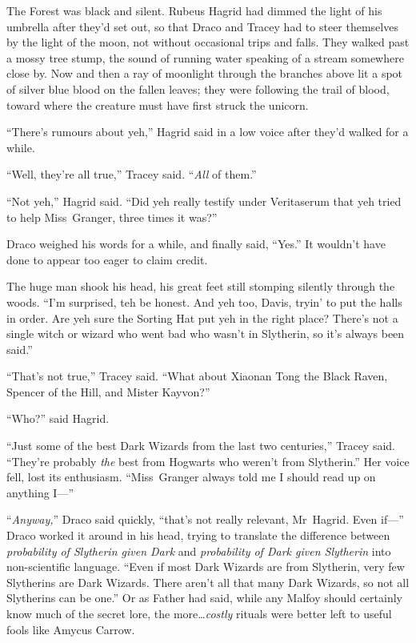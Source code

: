 The Forest was black and silent. Rubeus Hagrid had dimmed the light of his umbrella after they’d set out, so that Draco and Tracey had to steer themselves by the light of the moon, not without occasional trips and falls. They walked past a mossy tree stump, the sound of running water speaking of a stream somewhere close by. Now and then a ray of moonlight through the branches above lit a spot of silver blue blood on the fallen leaves; they were following the trail of blood, toward where the creature must have first struck the unicorn.

“There’s rumours about yeh,” Hagrid said in a low voice after they’d walked for a while.

“Well, they’re all true,” Tracey said. “\emph{All} of them.”

“Not yeh,” Hagrid said. “Did yeh really testify under Veritaserum that yeh tried to help Miss~Granger, three times it was?”

Draco weighed his words for a while, and finally said, “Yes.” It wouldn’t have done to appear too eager to claim credit.

The huge man shook his head, his great feet still stomping silently through the woods. “I’m surprised, teh be honest. And yeh too, Davis, tryin’ to put the halls in order. Are yeh sure the Sorting Hat put yeh in the right place? There’s not a single witch or wizard who went bad who wasn’t in Slytherin, so it’s always been said.”

“That’s not true,” Tracey said. “What about Xiaonan Tong the Black Raven, Spencer of the Hill, and Mister Kayvon?”

“Who?” said Hagrid.

“Just some of the best Dark Wizards from the last two centuries,” Tracey said. “They’re probably \emph{the} best from Hogwarts who weren’t from Slytherin.” Her voice fell, lost its enthusiasm. “Miss~Granger always told me I should read up on anything I—”

“\emph{Anyway,}” Draco said quickly, “that’s not really relevant, Mr~Hagrid. Even if—” Draco worked it around in his head, trying to translate the difference between \emph{probability of Slytherin given Dark} and \emph{probability of Dark given Slytherin} into non-scientific language. “Even if most Dark Wizards are from Slytherin, very few Slytherins are Dark Wizards. There aren’t all that many Dark Wizards, so not all Slytherins can be one.” Or as Father had said, while any Malfoy should certainly know much of the secret lore, the more…\emph{costly} rituals were better left to useful fools like Amycus Carrow.


